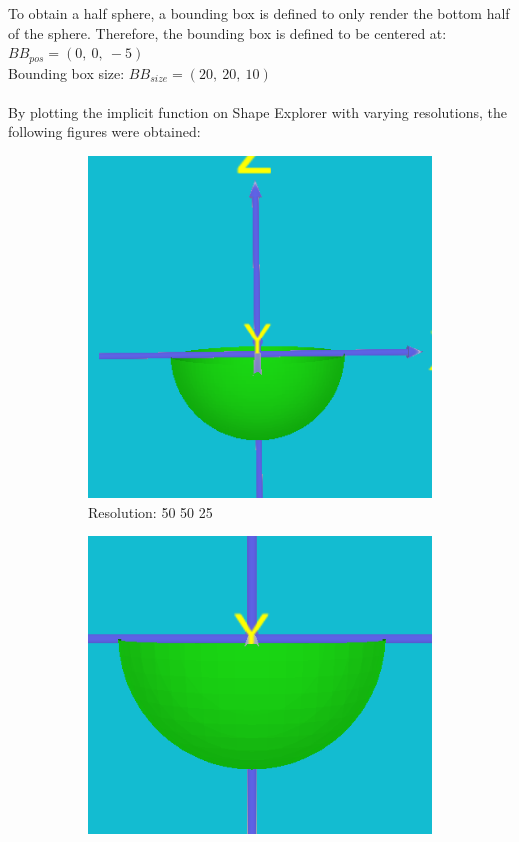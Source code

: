 \documentclass[acmlarge,nonacm=true]{acmart}
\begin{document}
To obtain a half sphere, a bounding box is defined to only render the bottom half 
of the sphere. Therefore, the bounding box is defined to be centered at: $BB_{pos} = (0,\ 0,\ -5)$\\
Bounding box size: $BB_{size} = (20,\ 20,\ 10)$\\\\
By plotting the implicit function on Shape Explorer with varying resolutions, the following figures were obtained:
\begin{figure}[H]
	\begin{subfigure}{.33\textwidth}
		\centering
		\includegraphics[width=.8\linewidth]{fig/1b50_50_25}
		\caption{Resolution: 50 50 25}
	  \end{subfigure}
	\begin{subfigure}{.33\textwidth}
	  \centering
	  \includegraphics[width=.8\linewidth]{fig/1b20_20_10}

\end{subfigure}
\end{figure}
\end{document}
